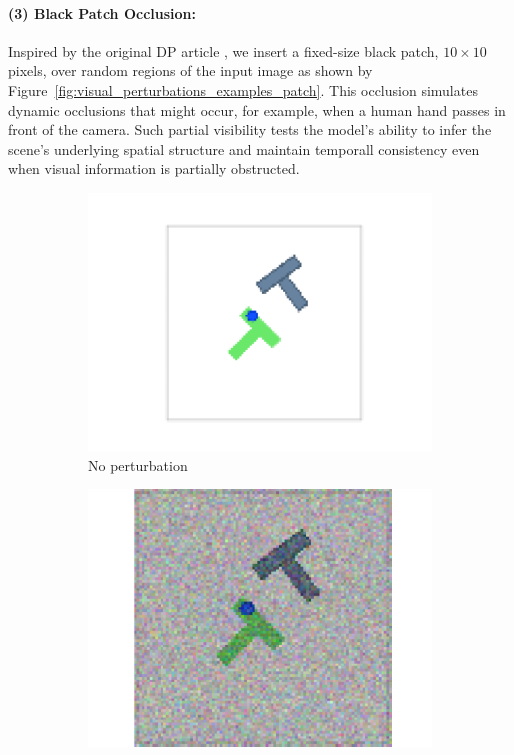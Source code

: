 \paragraph{(3) Black Patch Occlusion:}
Inspired by the original DP article \cite{chi2023diffusion}, we insert a fixed-size black patch, $10\times10$ pixels, over random regions of the input image as shown by Figure~\ref{fig:visual_perturbations_examples_patch}.
This occlusion simulates dynamic occlusions that might occur, for example, when a human hand passes in front of the camera.
Such partial visibility tests the model's ability to infer the scene's underlying spatial structure and maintain temporall consistency even when visual information is partially obstructed.\\

\begin{figure}[!htb]
    \centering
    \begin{subfigure}[b]{0.3\linewidth}
        \centering
        \includegraphics[width=\linewidth]{figures/illustration.pdf}
        \caption{No perturbation}
        \label{fig:visual_perturbations_examples_clean}
    \end{subfigure}
    \begin{subfigure}[b]{0.3\linewidth}
        \centering
        \includegraphics[width=\linewidth]{figures/illustration_noise.pdf}

\end{subfigure}
\end{figure}
